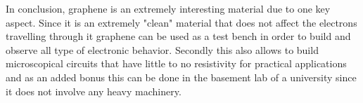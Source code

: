 \documentclass[12pt,a4paper]{article}
\begin{document}
In conclusion, graphene is an extremely interesting material due to one key aspect. Since it is an extremely "clean" material that does not affect the electrons travelling through it graphene can be used as a test bench in order to build and observe all type of electronic behavior. Secondly this also allows to build microscopical circuits that have little to no resistivity for practical applications and as an added bonus this can be done in the basement lab of a university since it does not involve any heavy machinery. 
\end{document}
